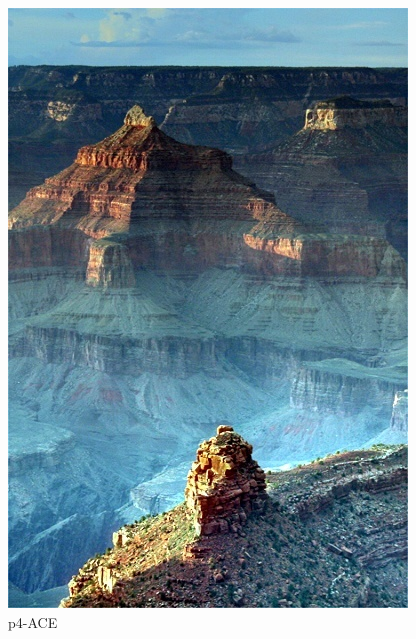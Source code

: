 \documentclass[12pt]{article}
\begin{document}
\begin{figure}[!h]
\begin{minipage}[t]{0.24\linewidth}
        \includegraphics[width=0.9\linewidth]{sample_pictures/after_p4_ACE.jpg}
        \caption*{p4-ACE}
    \end{minipage}\begin{minipage}[t]{0.24\linewidth}
        \centering

\end{minipage}
\end{figure}
\end{document}
